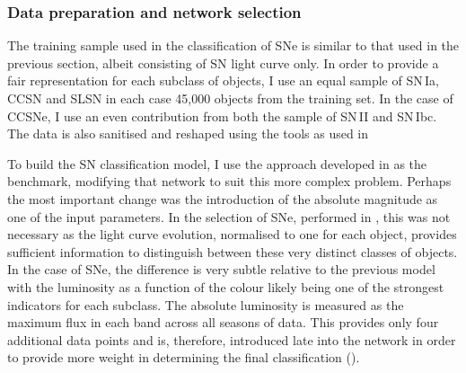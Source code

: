 \subsubsection{Data preparation and network selection} \label{sec:SNClassificationNetwork}
The training sample used in the classification of SNe is similar to that used in the previous section, albeit consisting of SN light curve only. In order to provide a fair representation for each subclass of objects, I use an equal sample of SN\,Ia, CCSN and SLSN in each case 45,000 objects from the training set. In the case of CCSNe, I use an even contribution from both the sample of SN\,II and SN\,Ibc. The data is also sanitised and reshaped using the tools as used in 

To build the SN classification model, I use the approach developed in  as the benchmark, modifying that network to suit this more complex problem. Perhaps the most important change was the introduction of the absolute magnitude as one of the input parameters. In the selection of SNe, performed in , this was not necessary as the light curve evolution, normalised to one for each object, provides sufficient information to distinguish between these very distinct classes of objects. In the case of SNe, the difference is very subtle relative to the previous model with the luminosity as a function of the colour likely being one of the strongest indicators for each subclass. The absolute luminosity is measured as the maximum flux in each band across all seasons of data. This provides only four additional data points and is, therefore, introduced late into the network in order to provide more weight in determining the final classification ().

